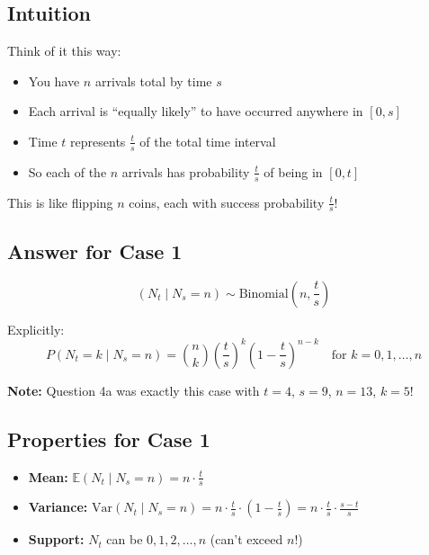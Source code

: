 \documentclass[11pt]{article}
\begin{document}
\subsection{Intuition}

Think of it this way:
\begin{itemize}
    \item You have $n$ arrivals total by time $s$
    \item Each arrival is ``equally likely'' to have occurred anywhere in $[0, s]$
    \item Time $t$ represents $\frac{t}{s}$ of the total time interval
    \item So each of the $n$ arrivals has probability $\frac{t}{s}$ of being in $[0, t]$
\end{itemize}

This is like flipping $n$ coins, each with success probability $\frac{t}{s}$!

\subsection{Answer for Case 1}

\begin{tcolorbox}[colback=green!10!white,colframe=green!75!black,title={Case 1: $t < s$}]
\[
\boxed{(N_t \mid N_s = n) \sim \text{Binomial}\left(n, \frac{t}{s}\right)}
\]

Explicitly:
\[
P(N_t = k \mid N_s = n) = \binom{n}{k} \left(\frac{t}{s}\right)^k \left(1 - \frac{t}{s}\right)^{n-k} \quad \text{for } k = 0, 1, \ldots, n
\]
\end{tcolorbox}

\textbf{Note:} Question 4a was exactly this case with $t = 4$, $s = 9$, $n = 13$, $k = 5$!

\subsection{Properties for Case 1}

\begin{itemize}
    \item \textbf{Mean:} $\mathbb{E}(N_t \mid N_s = n) = n \cdot \frac{t}{s}$
    \item \textbf{Variance:} $\text{Var}(N_t \mid N_s = n) = n \cdot \frac{t}{s} \cdot \left(1 - \frac{t}{s}\right) = n \cdot \frac{t}{s} \cdot \frac{s-t}{s}$
    \item \textbf{Support:} $N_t$ can be $0, 1, 2, \ldots, n$ (can't exceed $n$!)
\end{itemize}
\end{document}
